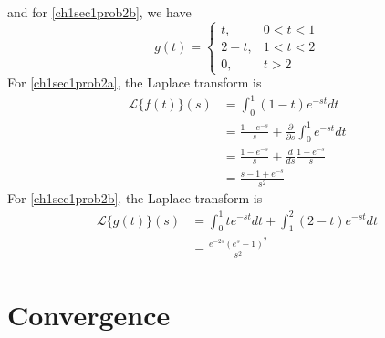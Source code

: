 \begin{exercise}
\[  \]
  and for \cref{ch1sec1prob2b}, we have
  \[
  g(t) =
  \begin{cases}
    t, & 0 < t < 1\\
    2 - t, & 1 < t < 2\\
    0, & t > 2
  \end{cases}
  \]
  For \cref{ch1sec1prob2a}, the Laplace transform is
  \begin{align*}
    \mathcal{L}\{f(t)\}(s) & = \int_0^1(1 - t)e^{-st}dt\\
                           & = \frac{1 - e^{-s}}{s} +
                             \frac{\partial }{\partial s}\int_0^1e^{-st}dt\\
                           & = \frac{1 - e^{-s}}{s} + \frac{d}{ds}
                             \frac{1 - e^{-s}}{s}\\
                           & = \frac{s - 1 + e^{-s}}{s^2}
  \end{align*}
  For \cref{ch1sec1prob2b}, the Laplace transform is
  \begin{align*}
    \mathcal{L}\{g(t)\}(s) & = \int_0^1te^{-st}dt + \int_1^2(2 - t)e^{-st}dt\\
                           & = \frac{e^{-2s}(e^s - 1)^2}{s^2}
  \end{align*}
\end{exercise}

\section{Convergence}

